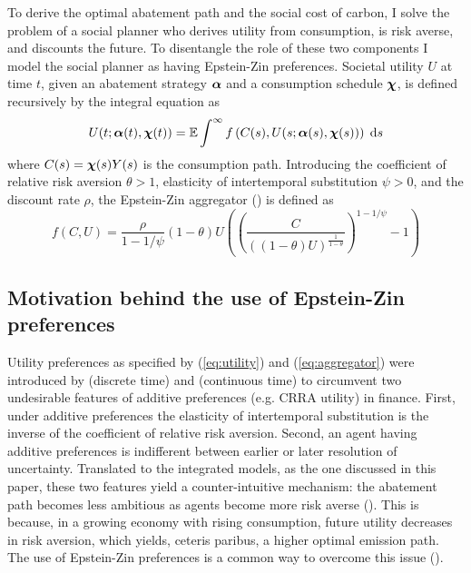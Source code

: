 \documentclass[../../main.tex]{subfiles}
\begin{document}
To derive the optimal abatement path and the social cost of carbon, I solve the problem of a social planner who derives utility from consumption, is risk averse, and discounts the future. To disentangle the role of these two components I model the social planner as having Epstein-Zin preferences. Societal utility $U$ at time $t$, given an abatement strategy $\bm{\alpha}$ and a consumption schedule $\bm{\chi}$, is defined recursively by the integral equation as \begin{equation} \label{eq:utility}
    U(t; \bm{\alpha}(t), \bm{\chi}(t)) = \operatorname{\mathbb{E}} \int^{\infty} f\left(C(s), U(s; \bm{\alpha}(s), \bm{\chi}(s))\right) \; \mathrm{d}s
\end{equation} where $C(s) = \bm{\chi}(s) Y(s)$ is the consumption path. Introducing the coefficient of relative risk aversion $\theta > 1$, elasticity of intertemporal substitution $\psi > 0$, and the discount rate $\rho$, the Epstein-Zin aggregator (\cite{duffie_asset_1992}) is defined as \begin{equation} \label{eq:aggregator}
    f(C, U) = \frac{\rho}{1 - 1 / \psi} (1 - \theta) U  \left( \left(\frac{C}{((1 - \theta) U)^{\frac{1}{1 - \theta}}}\right)^{1 - 1 / \psi} - 1 \right)
\end{equation}

\subsection{Motivation behind the use of Epstein-Zin preferences}

Utility preferences as specified by (\ref{eq:utility}) and (\ref{eq:aggregator}) were introduced by  (discrete time) and  (continuous time) to circumvent two undesirable features of additive preferences (e.g. CRRA utility) in finance. First, under additive preferences the elasticity of intertemporal substitution is the inverse of the coefficient of relative risk aversion. Second, an agent having additive preferences is indifferent between earlier or later resolution of uncertainty. Translated to the integrated models, as the one discussed in this paper, these two features yield a counter-intuitive mechanism: the abatement path becomes less ambitious as agents become more risk averse (\cite{pindyck_economic_2013}). This is because, in a growing economy with rising consumption, future utility decreases in risk aversion, which yields, ceteris paribus, a higher optimal emission path. The use of Epstein-Zin preferences is a common way to overcome this issue (\cite{pindyck_economic_2013, crost_optimal_2013, ackerman_epsteinzin_2013, hambel_optimal_2021,  olijslagers_discounting_2019}).
\end{document}
